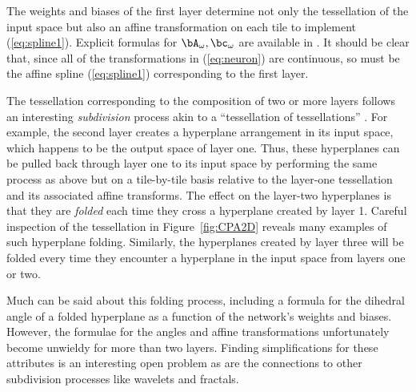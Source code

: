 \documentclass{notices}
\begin{document}
The weights and biases of the first layer determine not only the tessellation of the input space but also an affine transformation on each tile to implement (\ref{eq:spline1}).
Explicit formulas for $\bA_\omega,\bc_\omega$ are available in \cite{romain}.
It should be clear that, since all of the transformations in (\ref{eq:neuron}) are continuous, so must be the affine spline (\ref{eq:spline1}) corresponding to the first layer.


The tessellation corresponding to the composition of two or more layers follows an interesting {\em subdivision} process akin to a ``tessellation of tessellations'' \cite{romain}.
For example, the second layer creates a hyperplane arrangement in its input space, which happens to be the output space of layer one.
Thus, these hyperplanes can be pulled back through layer one to its input space by performing the same process as above but on a tile-by-tile basis relative to the layer-one tessellation and its associated affine transforms.
The effect on the layer-two hyperplanes is that they are {\em folded} each time they cross a hyperplane created by layer 1.
Careful inspection of the tessellation in Figure~\ref{fig:CPA2D} reveals many examples of such hyperplane folding.
Similarly, the hyperplanes created by layer three will be folded every time they encounter a hyperplane in the input space from layers one or two.


Much can be said about this folding process, including a formula for the dihedral angle of a folded hyperplane as a function of the network's weights and biases. 
However, the formulae for the angles and affine transformations unfortunately become unwieldy for more than two layers.
Finding simplifications for these attributes is an interesting open problem as are the connections to other subdivision processes like wavelets and fractals.
\end{document}
